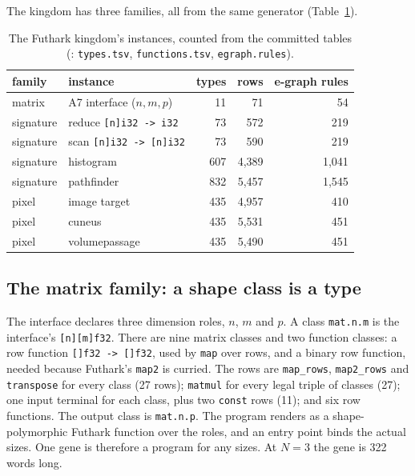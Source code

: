 \documentclass[sigconf,nonacm]{acmart}
\DeclareRobustCommand{\src}[1]{{\footnotesize\path{#1}}}
\newcommand{\ty}[1]{\texttt{#1}}
\begin{document}
The kingdom has three families, all from the same generator
(Table~\ref{tab:families}).

\begin{table}[t]
\caption{The Futhark kingdom's instances, counted from the committed tables
(\src{kingdoms/futhark/}: \texttt{types.tsv}, \texttt{functions.tsv}, \texttt{egraph.rules}).}
\label{tab:families}
\small
\begin{tabular}{@{}llrrr@{}}
\toprule
family & instance & types & rows & e-graph rules\\
\midrule
matrix    & A7 interface ($n,m,p$)        & 11  & 71    & 54\\
signature & reduce \texttt{[n]i32 -> i32}   & 73  & 572   & 219\\
signature & scan \texttt{[n]i32 -> [n]i32}  & 73  & 590   & 219\\
signature & histogram                     & 607 & 4,389 & 1,041\\
signature & pathfinder                    & 832 & 5,457 & 1,545\\
pixel     & image target                  & 435 & 4,957 & 410\\
pixel     & cuneus                        & 435 & 5,531 & 451\\
pixel     & volumepassage                 & 435 & 5,490 & 451\\
\bottomrule
\end{tabular}
\end{table}

\subsection{The matrix family: a shape class is a type}
The interface declares three dimension roles, $n$, $m$ and $p$. A class
\ty{mat.n.m} is the interface's \texttt{[n][m]f32}. There are nine matrix
classes and two function classes: a row function \texttt{[]f32 -> []f32}, used
by \texttt{map} over rows, and a binary row function, needed because Futhark's
\texttt{map2} is curried. The rows are \texttt{map\_rows}, \texttt{map2\_rows}
and \texttt{transpose} for every class (27 rows); \texttt{matmul} for every
legal triple of classes (27); one input terminal for each class, plus two
\texttt{const} rows (11); and six row functions. The output class is
\ty{mat.n.p}. The program renders as a shape-polymorphic Futhark function over
the roles, and an entry point binds the actual sizes. One gene is therefore a
program for any sizes. At $N=3$ the gene is 322 words long.
\end{document}
